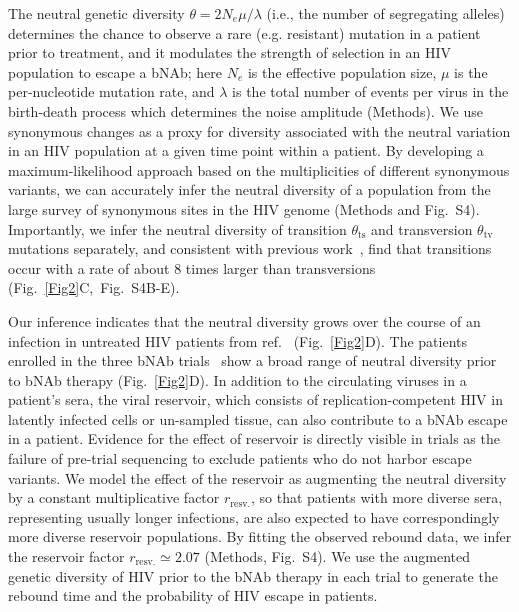 \documentclass[aps,prx,noshowpacs,twocolumn,nofootinbib]{revtex4-2}
\begin{document}
 The neutral genetic diversity $\theta = 2N_e\mu/\lambda$ (i.e., the number of segregating alleles) determines the chance to observe a rare (e.g. resistant) mutation in a patient prior to treatment, and it modulates the strength of selection in an HIV population to escape a bNAb; here $N_e$ is the effective population size, $\mu$ is the per-nucleotide mutation rate, and $\lambda$ is the total number of events per virus in the birth-death process which determines the noise amplitude (Methods).  We use synonymous changes as a proxy for diversity  associated with the neutral variation in an HIV population at a given time point within a patient.  By developing a maximum-likelihood  approach based on the multiplicities of different synonymous variants, we can  accurately infer the neutral diversity of a population from the large survey of synonymous sites in the HIV genome (Methods and Fig.~S4).
Importantly, we infer the neutral diversity of transition $\theta_\text{ts}$ and transversion $\theta_\text{tv}$ mutations separately, and consistent with previous work~\cite{Feder:2016bc,Zanini:2017in}, find that transitions occur with a rate of about 8 times larger than transversions (Fig.~\ref{Fig2}C,~Fig.~S4B-E).

Our inference indicates that the neutral diversity grows over the course of an infection in untreated HIV patients from ref.~\cite{Zanini:2015gg} (Fig.~\ref{Fig2}D). The patients enrolled in the three bNAb trials~\cite{Caskey:2015hm,Caskey:2017el,bar-onSafetyAntiviralActivity2018} show a broad range of neutral diversity prior to bNAb therapy (Fig.~\ref{Fig2}D). In addition to the circulating viruses in a patient's sera, the viral reservoir, which consists of replication-competent HIV in latently infected cells or un-sampled tissue,  can also contribute to a bNAb escape in a patient. Evidence for the effect of reservoir is directly visible in trials as the failure of pre-trial sequencing to exclude
	patients who do not harbor escape variants.
We model the effect of the reservoir as augmenting the neutral diversity by a constant multiplicative factor $r_\text{resv.}$,
	so that patients with more diverse sera, representing usually longer infections, 
	are also expected to have correspondingly more diverse reservoir populations. By fitting the observed rebound data, we infer the reservoir factor $r_\text{resv.}\simeq 2.07$ (Methods, Fig.~S4). We use the  augmented genetic diversity  of HIV prior to the bNAb therapy in each trial  to generate the rebound time and the probability of HIV escape in patients. \\
	
\end{document}
